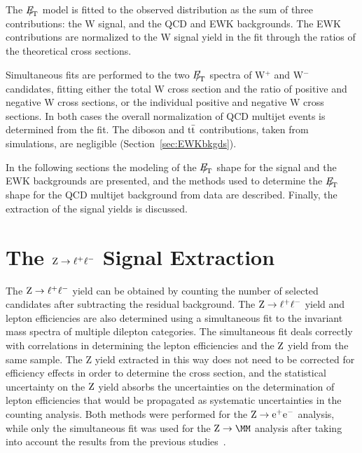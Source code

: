 The ${E\!\!\!/}_{\!\mathrm{T}}$ model is fitted to the observed distribution as the sum of three contributions:
the W signal, and the QCD and EWK backgrounds.
The EWK contributions are normalized to the W signal yield in the fit
through the ratios of the theoretical cross sections.

Simultaneous fits are performed to the two ${E\!\!\!/}_{\!\mathrm{T}}$ spectra of W$^+$ and W$^-$ candidates,
fitting either the total W cross section and
the ratio of positive and negative W cross sections, or
the individual positive and negative W cross sections.
In both cases the overall normalization of QCD multijet events is determined from the fit.
The diboson and $\mathrm{t}\bar{\mathrm{t}}$ contributions,
taken from simulations, are negligible (Section~\ref{sec:EWKbkgds}).


\par
In the following sections the modeling
of the ${E\!\!\!/}_{\!\mathrm{T}}$ shape for the signal and the EWK backgrounds are presented,
and the methods used to determine
the ${E\!\!\!/}_{\!\mathrm{T}}$ shape for the QCD multijet background from data are
 described.
Finally, the extraction of the signal yields is discussed.



%










\section{\texorpdfstring{The $\mathrm{Z} \rightarrow \ell^+ \ell^-$ Signal Extraction}{The Z-> ll Signal Extraction}}
\label{sec:ZsignalExtraction}

The $\mathrm{Z} \rightarrow \ell^+ \ell^-$ yield can be obtained by counting the
number of selected candidates after subtracting the residual background.
The $\mathrm{Z} \rightarrow \ell^+ \ell^-$ yield and lepton efficiencies are also determined using a simultaneous fit
to the invariant mass spectra of multiple dilepton categories.
The simultaneous fit deals correctly with correlations
in determining the lepton efficiencies and the $\mathrm{Z}$ yield
from the same sample.
The Z yield extracted in this way does not need to be corrected for efficiency effects
in order to determine the cross section, and
the statistical uncertainty on the $\mathrm{Z}$ yield absorbs the uncertainties
on the determination of lepton efficiencies that would be propagated as systematic
uncertainties in the counting analysis.
Both methods were performed for the $\mathrm{Z} \rightarrow \mathrm{e}^+\mathrm{e}^-$ analysis, while only
the simultaneous fit was used for the $\Zmm$ analysis
after taking into account the results from the previous studies~\cite{WZCMS:2010}.

